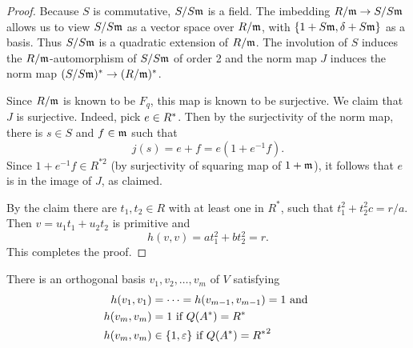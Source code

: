 \begin{proof}
Because $S$ is commutative, $S/S\mathfrak{m}$ is a field. The imbedding $R/\mathfrak{m} \to S/S\mathfrak{m}$ allows us to view $S/S\mathfrak{m}$ as a vector space over $R/\mathfrak{m}$,
with $\{1 + S\mathfrak{m}, \delta + S \mathfrak{m} \}$ as a basis. Thus $S/S\mathfrak{m}$ is a quadratic extension of $R/\mathfrak{m}$.
The involution of $S$ induces the $R/\mathfrak{m}$-automorphism of $S/S\mathfrak{m}$ of order 2 and the norm map $J$ induces the norm map $(S/S\mathfrak{m})^* \to (R/\mathfrak{m})^*$.

Since $R/\mathfrak{m}$ is known to be $F_q$, this map is known to be surjective.
We claim that $J$ is surjective.
Indeed, pick $e \in R^*$.
Then by the surjectivity of the norm map, there is $s \in S$ and $f \in \mathfrak{m}$ such that
\[
j(s) = e + f = e(1 + e^{-1}f).
\]
Since $1 + e^{-1} f \in R^{*2}$ (by surjectivity of squaring map of $1 + \mathfrak{m}$), it follows that $e$ is in the image of $J$, as claimed.

By the claim there are $t_1, t_2 \in R$ with at least one in $R^*$, such that $t_1^2 + t_2^2 c = r/a$.
Then $v = u_1 t_1 + u_2 t_2$ is primitive and
\[
h(v,v) = at_1^2 + bt_2^2 = r.
\]
This completes the proof.
\end{proof}

\begin{theorem}\label{theorem3.5}
There is an orthogonal basis $v_1, v_2, \dotsc, v_m$ of $V$ satisfying
\begin{align*}
  h(v_1, v_1) &= \dotsb = h(v_{m-1}, v_{m-1}) = 1 \text{ and } \\
  h(v_m, v_m) &= 1 \text{ if } Q(A^*) = R^* \\
  h(v_m, v_m) &\in \{1, \varepsilon \} \text{ if } Q(A^*) = {R^*}^2
\end{align*}
\end{theorem}

